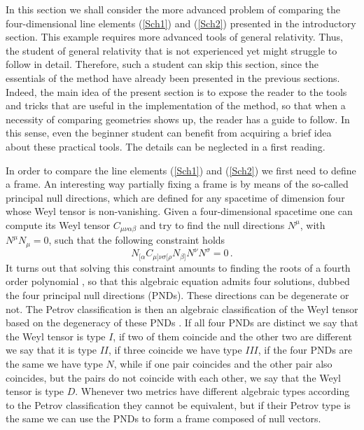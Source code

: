 \documentclass[twocolumn,prd,aps,showpacs,showkeys,amsmath,amssymb]{revtex4-1}
\begin{document}
In this section we shall consider the more advanced problem of comparing the four-dimensional line elements (\ref{Sch1}) and (\ref{Sch2}) presented in the introductory section. This example requires more advanced tools of general relativity. Thus, the student of general relativity that is not experienced yet might struggle to follow in detail. Therefore, such a student can skip this section, since the essentials of the method have already been presented in the previous sections. Indeed, the main idea of the present section is to expose the reader to the tools and tricks that are useful in the implementation of the method, so that when a necessity of comparing geometries shows up, the reader has a guide to follow. In this sense, even the beginner student can benefit from acquiring a brief idea about these practical tools. The details can be neglected in a first reading.



In order to compare the line elements (\ref{Sch1}) and (\ref{Sch2}) we first need to define a frame.
An interesting way partially fixing a frame is by means of the so-called principal null directions, which are defined for any spacetime of dimension four whose Weyl tensor is non-vanishing. Given a four-dimensional spacetime one can compute its Weyl tensor $C_{\mu\nu\alpha\beta}$ and try to find the null directions $N^\mu$, with $N^\mu N_\mu = 0$, such that the following constraint holds
\begin{equation}\label{PND}
  N_{[\alpha}C_{\mu]\nu\sigma[\rho}N_{\beta]}N^\nu N^\sigma = 0 \,.
\end{equation}
It turns out that solving this constraint amounts to finding the roots of a fourth order polynomial \cite{chandrasekhar}, so that this algebraic equation admits four solutions, dubbed the four principal null directions (PNDs). These directions can be degenerate or not. The Petrov classification is then an algebraic classification of the Weyl tensor based on the degeneracy of these PNDs \cite{chandrasekhar,art1}. If all four PNDs are distinct we say that the Weyl tensor is type $I$, if two of them coincide and the other two are different we say that it is type $II$, if three coincide we have type $III$, if the four PNDs are the same we have type $N$, while if one pair coincides and the other pair also coincides, but the pairs do not coincide with each other, we say that the Weyl tensor is type $D$. Whenever two metrics have different algebraic types according to the Petrov classification they cannot be equivalent, but if their Petrov type is the same we can use the PNDs to form a frame composed of null vectors.
\end{document}
